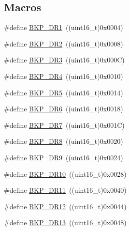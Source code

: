 \subsection*{Macros}
\begin{DoxyCompactItemize}
\item 
\#define \hyperlink{group___data___backup___register_ga5d4c3eeaccafcfc0ee3b5dc01381bab0}{B\+K\+P\+\_\+\+D\+R1}~((uint16\+\_\+t)0x0004)
\item 
\#define \hyperlink{group___data___backup___register_ga73867f10a3ef17eeb0d3ace641f185ad}{B\+K\+P\+\_\+\+D\+R2}~((uint16\+\_\+t)0x0008)
\item 
\#define \hyperlink{group___data___backup___register_gadcc77540e016c6e8dffab223af35ae88}{B\+K\+P\+\_\+\+D\+R3}~((uint16\+\_\+t)0x000\+C)
\item 
\#define \hyperlink{group___data___backup___register_gab327f2365ef58f3163f7fe8fa7b3c56e}{B\+K\+P\+\_\+\+D\+R4}~((uint16\+\_\+t)0x0010)
\item 
\#define \hyperlink{group___data___backup___register_ga21191497b79eb37ab00a1564e060e5ca}{B\+K\+P\+\_\+\+D\+R5}~((uint16\+\_\+t)0x0014)
\item 
\#define \hyperlink{group___data___backup___register_ga9d84a78d9c99d57844cfc557f4c047b4}{B\+K\+P\+\_\+\+D\+R6}~((uint16\+\_\+t)0x0018)
\item 
\#define \hyperlink{group___data___backup___register_gaed1b548c12929fbfbc57548ec1316df0}{B\+K\+P\+\_\+\+D\+R7}~((uint16\+\_\+t)0x001\+C)
\item 
\#define \hyperlink{group___data___backup___register_gae6ed231677e748d838f37e7ab89e51ca}{B\+K\+P\+\_\+\+D\+R8}~((uint16\+\_\+t)0x0020)
\item 
\#define \hyperlink{group___data___backup___register_ga69f61ba6d9ed1092dcd82a5df1a0e054}{B\+K\+P\+\_\+\+D\+R9}~((uint16\+\_\+t)0x0024)
\item 
\#define \hyperlink{group___data___backup___register_ga82bb6da0b7a29a737b2d2b03c0561260}{B\+K\+P\+\_\+\+D\+R10}~((uint16\+\_\+t)0x0028)
\item 
\#define \hyperlink{group___data___backup___register_ga7784d76b7357c12fcc2dce349b3d7b6f}{B\+K\+P\+\_\+\+D\+R11}~((uint16\+\_\+t)0x0040)
\item 
\#define \hyperlink{group___data___backup___register_ga56c63e631781366c4c0c289a27eb325f}{B\+K\+P\+\_\+\+D\+R12}~((uint16\+\_\+t)0x0044)
\item 
\#define \hyperlink{group___data___backup___register_ga35202788ca784ad00d2ee11d54990c86}{B\+K\+P\+\_\+\+D\+R13}~((uint16\+\_\+t)0x0048)

\end{DoxyCompactItemize}
